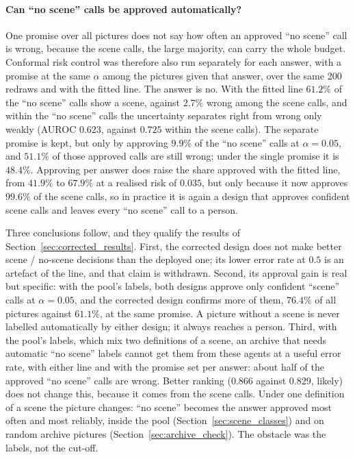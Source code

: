\paragraph{Can ``no scene'' calls be approved automatically?} One promise over all pictures does not say how often an approved ``no scene'' call is wrong, because the scene calls, the large majority, can carry the whole budget. Conformal risk control was therefore also run separately for each answer, with a promise at the same $\alpha$ among the pictures given that answer, over the same 200 redraws and with the fitted line. The answer is no. With the fitted line $61.2\%$ of the ``no scene'' calls show a scene, against $2.7\%$ wrong among the scene calls, and within the ``no scene'' calls the uncertainty separates right from wrong only weakly (AUROC $0.623$, against $0.725$ within the scene calls). The separate promise is kept, but only by approving $9.9\%$ of the ``no scene'' calls at $\alpha=0.05$, and $51.1\%$ of those approved calls are still wrong; under the single promise it is $48.4\%$. Approving per answer does raise the share approved with the fitted line, from $41.9\%$ to $67.9\%$ at a realised risk of $0.035$, but only because it now approves $99.6\%$ of the scene calls, so in practice it is again a design that approves confident scene calls and leaves every ``no scene'' call to a person.

Three conclusions follow, and they qualify the results of Section~\ref{sec:corrected_results}. First, the corrected design does not make better scene / no-scene decisions than the deployed one; its lower error rate at $0.5$ is an artefact of the line, and that claim is withdrawn. Second, its approval gain is real but specific: with the pool's labels, both designs approve only confident ``scene'' calls at $\alpha = 0.05$, and the corrected design confirms more of them, $76.4\%$ of all pictures against $61.1\%$, at the same promise. A picture without a scene is never labelled automatically by either design; it always reaches a person. Third, with the pool's labels, which mix two definitions of a scene, an archive that needs automatic ``no scene'' labels cannot get them from these agents at a useful error rate, with either line and with the promise set per answer: about half of the approved ``no scene'' calls are wrong. Better ranking ($0.866$ against $0.829$, likely) does not change this, because it comes from the scene calls. Under one definition of a scene the picture changes: ``no scene'' becomes the answer approved most often and most reliably, inside the pool (Section~\ref{sec:scene_classes}) and on random archive pictures (Section~\ref{sec:archive_check}). The obstacle was the labels, not the cut-off.

